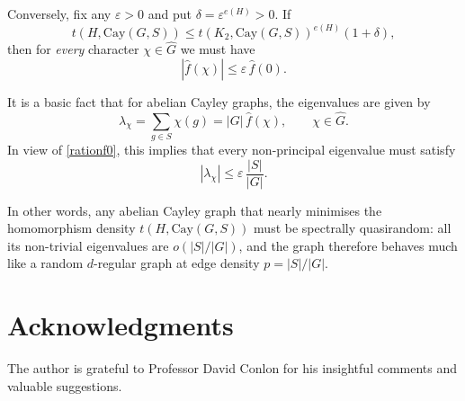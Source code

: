 \documentclass[12pt,a4paper]{article}
\theoremstyle{definition}
\theoremstyle{plain}
\theoremstyle{definition}
\begin{document}
Conversely, fix any $\varepsilon > 0$ and put $\delta = \varepsilon^{e(H)} > 0$.  
If
\[
   t(H, \mathrm{Cay}(G, S))
   \le
   t(K_2, \mathrm{Cay}(G, S))^{e(H)} (1 + \delta),
\]
then for \emph{every} character $\chi \in \widehat{G}$ we must have  
\begin{equation}\label{rationf0}
       |\widehat{f}(\chi)| \le \varepsilon\,\widehat{f}(0).
\end{equation}


It is a basic fact that for abelian Cayley graphs, the eigenvalues are given by
\[
   \lambda_\chi
   = \sum_{g \in S} \chi(g)
   = |G|\,\widehat{f}(\chi),
   \qquad \chi \in \widehat{G}.
\]
In view of \eqref{rationf0}, this implies that every non-principal eigenvalue must satisfy
\[
   |\lambda_\chi| \le \varepsilon\,\frac{|S|}{|G|}.
\]

In other words, any abelian Cayley graph that nearly minimises the homomorphism density 
$t(H, \mathrm{Cay}(G, S))$ must be spectrally quasirandom: 
all its non-trivial eigenvalues are $o(|S|/|G|)$, 
and the graph therefore behaves much like a random $d$-regular graph 
at edge density $p = |S|/|G|$.

\section{Acknowledgments}

The author is grateful to Professor David Conlon for his insightful comments and valuable suggestions.



\end{document}
